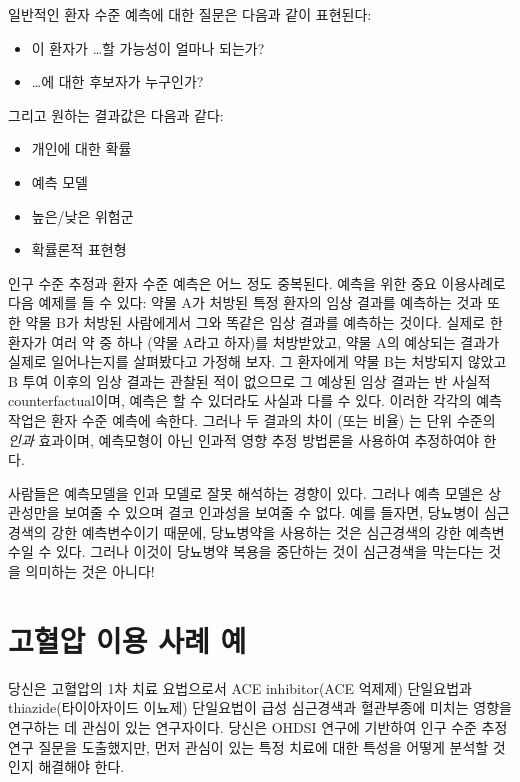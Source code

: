\documentclass[10.5pt]{book}
\providecommand{\tightlist}{%
  \setlength{\itemsep}{0pt}\setlength{\parskip}{0pt}}
\theoremstyle{definition}
\theoremstyle{definition}
\theoremstyle{definition}
\theoremstyle{remark}
\let\BeginKnitrBlock\begin \let\EndKnitrBlock\end
\begin{document}
일반적인 환자 수준 예측에 대한 질문은 다음과 같이 표현된다:

\begin{itemize}
\tightlist
\item
  이 환자가 \ldots{}할 가능성이 얼마나 되는가?
\item
  \ldots{}에 대한 후보자가 누구인가?
\end{itemize}

그리고 원하는 결과값은 다음과 같다:

\begin{itemize}
\tightlist
\item
  개인에 대한 확률
\item
  예측 모델
\item
  높은/낮은 위험군
\item
  확률론적 표현형
\end{itemize}

인구 수준 추정과 환자 수준 예측은 어느 정도 중복된다. 예측을 위한 중요
이용사례로 다음 예제를 들 수 있다: 약물 A가 처방된 특정 환자의 임상
결과를 예측하는 것과 또한 약물 B가 처방된 사람에게서 그와 똑같은 임상
결과를 예측하는 것이다. 실제로 한 환자가 여러 약 중 하나 (약물 A라고
하자)를 처방받았고, 약물 A의 예상되는 결과가 실제로 일어나는지를
살펴봤다고 가정해 보자. 그 환자에게 약물 B는 처방되지 않았고 B 투여
이후의 임상 결과는 관찰된 적이 없으므로 그 예상된 임상 결과는 반 사실적
counterfactual이며, 예측은 할 수 있더라도 사실과 다를 수 있다. 이러한
각각의 예측 작업은 환자 수준 예측에 속한다. 그러나 두 결과의 차이 (또는
비율) 는 단위 수준의 \emph{인과} 효과이며, 예측모형이 아닌 인과적 영향
추정 방법론을 사용하여 추정하여야 한다.

\BeginKnitrBlock{rmdimportant}
사람들은 예측모델을 인과 모델로 잘못 해석하는 경향이 있다. 그러나 예측
모델은 상관성만을 보여줄 수 있으며 결코 인과성을 보여줄 수 없다. 예를
들자면, 당뇨병이 심근경색의 강한 예측변수이기 때문에, 당뇨병약을
사용하는 것은 심근경색의 강한 예측변수일 수 있다. 그러나 이것이 당뇨병약
복용을 중단하는 것이 심근경색을 막는다는 것을 의미하는 것은 아니다!
\EndKnitrBlock{rmdimportant}

\section{고혈압 이용 사례 예}\label{---}

당신은 고혈압의 1차 치료 요법으로서 ACE inhibitor(ACE 억제제) 단일요법과
thiazide(타이아자이드 이뇨제) 단일요법이 급성 심근경색과 혈관부종에
미치는 영향을 연구하는 데 관심이 있는 연구자이다. 당신은 OHDSI 연구에
기반하여 인구 수준 추정 연구 질문을 도출했지만, 먼저 관심이 있는 특정
치료에 대한 특성을 어떻게 분석할 것인지 해결해야 한다.
\end{document}
